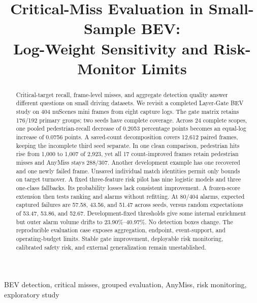 \documentclass[conference]{IEEEtran}
\begin{document}
\title{Critical-Miss Evaluation in Small-Sample BEV:\\Log-Weight Sensitivity and Risk-Monitor Limits}
\author{
}
\maketitle
\thispagestyle{plain}
\begin{abstract}
Critical-target recall, frame-level misses, and aggregate detection quality answer different questions on small driving datasets. We revisit a completed Layer-Gate BEV study on 404 nuScenes mini frames from eight capture logs. The gate matrix retains 176/192 primary groups; two seeds have complete coverage. Across 24 complete scopes, one pooled pedestrian-recall decrease of 0.2053 percentage points becomes an equal-log increase of 0.0756 points. A saved-count decomposition covers 12,612 paired frames, keeping the incomplete third seed separate. In one clean comparison, pedestrian hits rise from 1,000 to 1,007 of 2,923, yet all 17 count-improved frames retain pedestrian misses and AnyMiss stays 288/307. Another development example has one recovered and one newly failed frame. Unsaved individual match identities permit only bounds on target turnover. A fixed three-feature risk pilot has nine logistic models and three one-class fallbacks. Its probability losses lack consistent improvement. A frozen-score extension then tests ranking and alarms without refitting. At 80/404 alarms, expected captured failures are 57.58, 43.56, and 51.47 across seeds, versus random expectations of 53.47, 53.86, and 52.67. Development-fixed thresholds give some internal enrichment but outer alarm volume drifts to 23.90\%--40.97\%. No detection boxes change. The reproducible evaluation case exposes aggregation, endpoint, event-support, and operating-budget limits. Stable gate improvement, deployable risk monitoring, calibrated safety risk, and external generalization remain unestablished.
\end{abstract}
\begin{IEEEkeywords}
BEV detection, critical misses, grouped evaluation, AnyMiss, risk monitoring, exploratory study
\end{IEEEkeywords}
\end{document}
